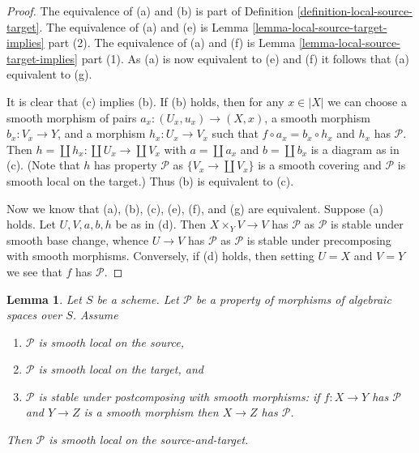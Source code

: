 \documentclass{stacks-project}
\theoremstyle{plain}
\newtheorem{lemma}[subsection]{Lemma}
\theoremstyle{definition}
\theoremstyle{remark}
\numberwithin{equation}{subsection}
\begin{document}
\begin{proof}
The equivalence of (a) and (b) is part of
Definition \ref{definition-local-source-target}.
The equivalence of (a) and (e) is
Lemma \ref{lemma-local-source-target-implies} part (2).
The equivalence of (a) and (f) is
Lemma \ref{lemma-local-source-target-implies} part (1).
As (a) is now equivalent to (e) and (f) it follows that
(a) equivalent to (g).

\medskip\noindent
It is clear that (c) implies (b). If (b) holds, then for any
$x \in |X|$ we can choose a smooth morphism of pairs
$a_x : (U_x, u_x) \to (X, x)$, a smooth morphism $b_x : V_x \to Y$, and
a morphism $h_x : U_x \to V_x$ such that $f \circ a_x = b_x \circ h_x$ and
$h_x$ has $\mathcal{P}$. Then $h = \coprod h_x : \coprod U_x \to \coprod V_x$
with $a = \coprod a_x$ and $b = \coprod b_x$ is a diagram as in (c).
(Note that $h$ has property $\mathcal{P}$ as $\{V_x \to \coprod V_x\}$
is a smooth covering and $\mathcal{P}$ is smooth local on the target.)
Thus (b) is equivalent to (c).

\medskip\noindent
Now we know that (a), (b), (c), (e), (f), and (g) are equivalent.
Suppose (a) holds. Let $U, V, a, b, h$ be as in (d). Then
$X \times_Y V \to V$ has $\mathcal{P}$ as $\mathcal{P}$ is stable under
smooth base change, whence $U \to V$ has $\mathcal{P}$ as $\mathcal{P}$
is stable under precomposing with smooth morphisms. Conversely, if (d)
holds, then setting $U = X$ and $V = Y$ we see that $f$ has $\mathcal{P}$.
\end{proof}

\begin{lemma}
\label{lemma-smooth-local-source-target}
Let $S$ be a scheme.
Let $\mathcal{P}$ be a property of morphisms of algebraic spaces over $S$.
Assume
\begin{enumerate}
\item $\mathcal{P}$ is smooth local on the source,
\item $\mathcal{P}$ is smooth local on the target, and
\item $\mathcal{P}$ is stable under postcomposing with smooth morphisms:
if $f : X \to Y$ has $\mathcal{P}$ and $Y \to Z$ is a smooth morphism
then $X \to Z$ has $\mathcal{P}$.
\end{enumerate}
Then $\mathcal{P}$ is smooth local on the source-and-target.
\end{lemma}
\end{document}
